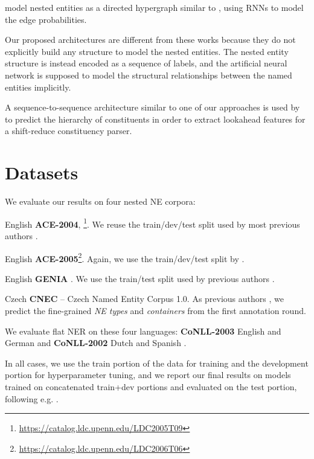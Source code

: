 \documentclass[11pt,a4paper]{article}
\newenvironment{citemize}{\begin{list}{}{\topsep=.5\smallskipamount\itemsep=0pt\parsep=1pt\labelwidth=.5em}}{\end{list}}
\begin{document}
\citet{Katiyar2018} model nested entities as a directed hypergraph similar to
\citet{Lu2015}, using RNNs to model the edge probabilities.

Our proposed architectures are different from these works because they do not
explicitly build any structure to model the nested entities. The nested entity
structure is instead encoded as a sequence of labels, and the artificial neural
network is supposed to model the structural relationships between the named
entities implicitly.

A sequence-to-sequence architecture similar to one of our approaches is used by
\cite{liu-zhang-2017-shift} to predict the hierarchy of constituents in order
to extract lookahead features for a shift-reduce constituency parser.


\section{Datasets}
\label{section:datasets}

We evaluate our results on four nested NE corpora:

\begin{citemize}
  \item English \textbf{ACE-2004},
    \cite{Doddington}\footnote{\url{https://catalog.ldc.upenn.edu/LDC2005T09}}.
    We reuse the train/dev/test split used by most previous authors
    \cite{Lu2015,Muis2017,Wang2018}.
  \item English \textbf{ACE-2005}\footnote{\url{https://catalog.ldc.upenn.edu/LDC2006T06}}.
    Again, we use the train/dev/test split by \citet{Lu2015,Muis2017,Wang2018}.
  \item English \textbf{GENIA} \cite{GENIA}. We use the  train/test split used
    by previous authors \cite{Finkel2009,Lu2015,Muis2017,Wang2018}.
  \item Czech \textbf{CNEC} -- Czech Named Entity Corpus 1.0. As previous authors \cite{Strakova2016}, we predict the  fine-grained \textit{NE types} and  \textit{containers} from the first annotation round.
\end{citemize}

We evaluate flat NER on these four languages: \textbf{CoNLL-2003} English and German \cite{CoNLL2003} and \textbf{CoNLL-2002} Dutch and Spanish \cite{CoNLL2002}.

In all cases, we use the train portion of the data for training and the
development portion for hyperparameter tuning, and we report our final results
on models trained on concatenated train+dev portions and evaluated on the test
portion, following e.g. \cite{Ratinov2009,Lample2016}.
\end{document}
